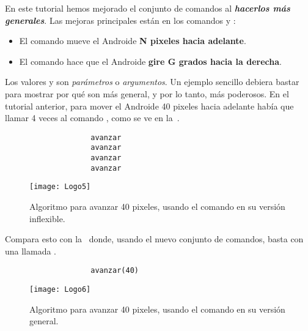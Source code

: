 En este tutorial hemos mejorado el conjunto de comandos al
\textit{\textbf{hacerlos más generales}}. Las mejoras principales
están en los comandos  y
:

\begin{itemize}
\item El comando  mueve el Androide \textbf{N
    pixeles hacia adelante}.

\item El comando  hace que el Androide
  \textbf{gire G grados hacia la derecha}.

\end{itemize}

Los valores  y  son \emph{parámetros} o
\emph{argumentos}. Un ejemplo sencillo debiera bastar para mostrar por
qué son más general, y por lo tanto, más poderosos. En el tutorial
anterior, para mover el Androide 40 pixeles hacia adelante había que
llamar 4 veces al comando , como se ve en
la~.

\begin{figure}[H]
\centering
\begin{minipage}{0.5\textwidth}
\centering
\begin{verbatim}
              avanzar             
              avanzar
              avanzar
              avanzar
\end{verbatim}
\end{minipage}%
%
\begin{minipage}{0.5\textwidth}
  \centering
  \texttt{[image: Logo5]}
\end{minipage}
\caption{Algoritmo para avanzar 40 pixeles, usando el comando
   en su versión inflexible.}
  \label{fig:Logo5}
\end{figure}

Compara esto con la~ donde,
usando el nuevo conjunto de comandos, basta con una llamada
.

\begin{figure}[H]
\centering
\begin{minipage}{0.5\textwidth}
\centering
\begin{verbatim}
              avanzar(40)
\end{verbatim}
\end{minipage}%
%
\begin{minipage}{0.5\textwidth}
  \centering
  \texttt{[image: Logo6]}
\end{minipage}
  \caption{Algoritmo para avanzar 40 pixeles, usando el comando
   en su versión general.}
  \label{fig:Logo6}
\end{figure}

